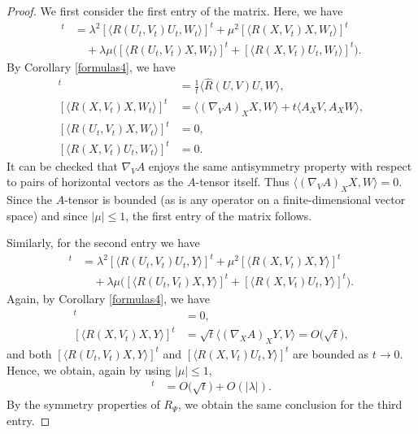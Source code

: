 \documentclass[11pt]{article}
\numberwithin{equation}{section}
\numberwithin{equation}{section}
\begin{document}
\begin{proof}
	We first consider the first entry of the matrix. Here, we have
	\begin{align*}
		[\langle R(\Psi,V_t)\Psi,W_t\rangle]^t&{}=\lambda^2[\langle R(U_t,V_t)U_t,W_t\rangle]^t+\mu^2 [\langle R(X,V_t)X,W_t\rangle]^t\\
		&\quad{} + \lambda\mu\bigl([\langle R(U_t,V_t)X,W_t\rangle]^t + [\langle R(X,V_t)U_t,W_t\rangle]^t \bigr).
	\end{align*}
	By Corollary \ref{formulas4}, we have
	\begin{align*}
		[\langle R(U_t,V_t)U_t,W_t\rangle]^t &{}= \frac{1}{t}\bigl\langle \hat{R}(U,V)U,W\bigr\rangle,\\
		[\langle R(X,V_t)X,W_t\rangle]^t &{}= \langle (\nabla_V A)_X X,W\rangle +t\langle A_X V,A_X W\rangle,\\
		[\langle R(U_t,V_t)X,W_t\rangle]^t &{}=0,\\
		[\langle R(X,V_t)U_t,W_t\rangle]^t &{}=0.
	\end{align*}
	It can be checked that $\nabla_V A$ enjoys the same antisymmetry property with respect to pairs of horizontal vectors as the $A$-tensor itself. Thus $\langle (\nabla_V A)_X X,W\rangle=0$. Since the $A$-tensor is bounded (as is any operator on a finite-dimensional vector space) and since $|\mu|\leq 1$, the first entry of the matrix follows.
	
	Similarly, for the second entry we have
	\begin{align*}
		[\langle R(\Psi,V_t)\Psi,Y\rangle ]^t&{}= \lambda^2[\langle R(U_t,V_t)U_t,Y\rangle]^t+\mu^2 [\langle R(X,V_t)X,Y\rangle]^t\\
		&\quad{} + \lambda\mu\bigl([\langle R(U_t,V_t)X,Y\rangle]^t + [\langle R(X,V_t)U_t,Y\rangle]^t \bigr).
	\end{align*}
	Again, by Corollary \ref{formulas4}, we have
	\begin{align*}
		[\langle R(U_t,V_t)U_t,Y\rangle]^t&{}=0,\\
		[\langle R(X,V_t)X,Y\rangle]^t&{}=\sqrt{t}\langle(\nabla_X A)_X Y,V\rangle=O\bigl(\sqrt{t}\bigr),
	\end{align*}
	and both $[\langle R(U_t,V_t)X,Y\rangle]^t$ and $[\langle R(X,V_t)U_t,Y\rangle]^t$ are bounded as $t\to 0$. Hence, we obtain, again by using $|\mu|\leq 1$,
	\begin{align*}
		[\langle R(U_t,V_t)U_t,Y\rangle]^t&{}=O\bigl(\sqrt{t}\bigr)+O(|\lambda|).
	\end{align*}
	By the symmetry properties of $R_\Psi$, we obtain the same conclusion for the third entry.
	

\end{proof}
\end{document}
